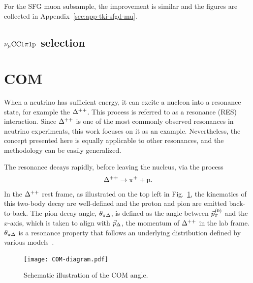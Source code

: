      For the SFG muon subsample, the improvement is similar and the figures are collected in Appendix~\ref{sec:app-tki-sfgd-mu}.


     \subsection{$\nu_{\mu}\textrm{CC}1\pi1\textrm{p}$ selection}
     \label{sec:mc-tki-1pi}

\section{COM}
\label{sec:mc-com}
When a neutrino has sufficient energy, it can excite a nucleon into a resonance state, for example the $\Delta^{++}$. 
This process is referred to as a resonance (RES) interaction.
Since $\Delta^{++}$ is one of the most commonly observed resonances in neutrino experiments, this work focuses on it as an example.
Nevertheless, the concept presented here is equally applicable to other resonances, and the methodology can be easily generalized.

The resonance decays rapidly, before leaving the nucleus, via the process
\begin{equation}
     \Delta^{++} \rightarrow \pi^+ + \textrm{p}.
\end{equation}
In the $\Delta^{++}$ rest frame, as illustrated on the top left in Fig.~\ref{fig:COM-diagram}, the kinematics of this two-body decay are well-defined and the proton and pion are emitted back-to-back.
The pion decay angle, $\theta_{\pi\Delta}$, is defined as the angle between $\vec{p}_{\pi}^{(0)}$ and the $x$-axis, which is taken to align with $\vec{p}_{\Delta}$, the momentum of $\Delta^{++}$ in the lab frame. 
$\theta_{\pi\Delta}$ is a resonance property that follows an underlying distribution defined by various models~\cite{Rein:1987cb,Kabirnezhad:2017jmf,Kabirnezhad:2020wtp,Kabirnezhad:2022znc}.

\begin{figure}[ht!]
\centering
\texttt{[image: COM-diagram.pdf]}
\caption{Schematic illustration of the COM angle.  }
\label{fig:COM-diagram}
\end{figure}


